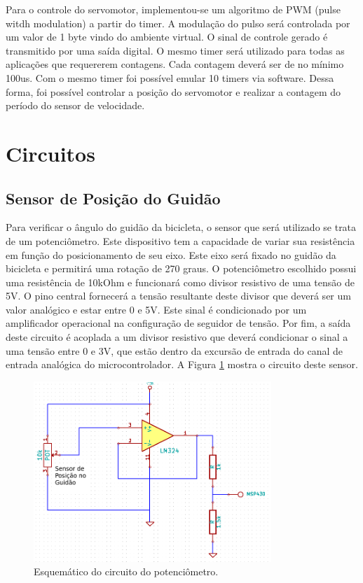 Para o controle do servomotor, implementou-se um algoritmo de PWM (pulse witdh modulation) a partir do timer. A modulação do pulso será controlada por um valor de 1 byte vindo do ambiente virtual. O sinal de controle gerado é transmitido por uma saída digital. O mesmo timer será utilizado para todas as aplicações que requererem contagens. Cada contagem deverá ser de no mínimo 100us. Com o mesmo timer foi possível emular 10 timers via software. Dessa forma, foi possível controlar a posição do servomotor e realizar a contagem do período do sensor de velocidade.

\section{Circuitos} %
\label{sec:circuito}

\subsection{Sensor de Posição do Guidão} %
\label{sub:poteciometro_guidao}

Para verificar o ângulo do guidão da bicicleta, o sensor que será utilizado se trata de um potenciômetro. Este dispositivo tem a capacidade de variar sua resistência em função do posicionamento de seu eixo. Este eixo será fixado no guidão da bicicleta e permitirá uma rotação de 270 graus. O potenciômetro escolhido possui uma resistência de 10kOhm e funcionará como divisor resistivo de uma tensão de 5V. O pino central fornecerá a tensão resultante deste divisor que deverá ser um valor analógico e estar entre 0 e 5V. Este sinal é condicionado por um amplificador operacional na configuração de seguidor de tensão. Por fim, a saída deste circuito é acoplada a um divisor resistivo que deverá condicionar o sinal a uma tensão entre 0 e 3V, que estão dentro da excursão de entrada do canal de entrada analógica do microcontrolador. A Figura \ref{fig:circ_pot} mostra o circuito deste sensor.

\begin{figure}[h]
  \centering
  \includegraphics[width=0.8\textwidth]
      {figuras/potenciometro.png}
  \caption{Esquemático do circuito do potenciômetro.}
  \label{fig:circ_pot}
\end{figure}

